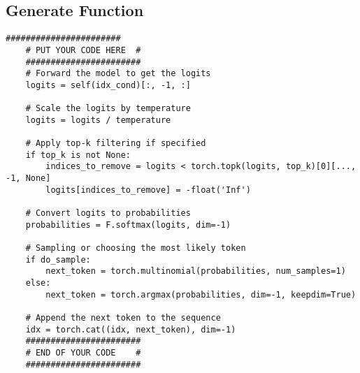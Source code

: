 \documentclass[a4paper]{article}
\begin{document}
\subsection{Generate Function}
\begin{lstlisting}[caption={GPT Class Generate Function}, label=lst:generate]
    #######################
    # PUT YOUR CODE HERE  #
    #######################
    # Forward the model to get the logits
    logits = self(idx_cond)[:, -1, :]

    # Scale the logits by temperature
    logits = logits / temperature

    # Apply top-k filtering if specified
    if top_k is not None:
        indices_to_remove = logits < torch.topk(logits, top_k)[0][..., -1, None]
        logits[indices_to_remove] = -float('Inf')

    # Convert logits to probabilities
    probabilities = F.softmax(logits, dim=-1)

    # Sampling or choosing the most likely token
    if do_sample:
        next_token = torch.multinomial(probabilities, num_samples=1)
    else:
        next_token = torch.argmax(probabilities, dim=-1, keepdim=True)

    # Append the next token to the sequence
    idx = torch.cat((idx, next_token), dim=-1)
    #######################
    # END OF YOUR CODE    #
    #######################
    \end{lstlisting}
\end{document}
